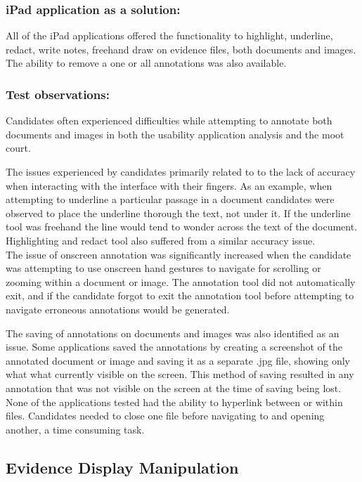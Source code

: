 \subsubsection{iPad application as a solution:}
All of the iPad applications offered the functionality to highlight, underline, redact, write notes, freehand draw on evidence files, both documents and images. The ability to remove a one or all annotations was also available.

\subsubsection{Test observations:}
Candidates often experienced difficulties while attempting to annotate both documents and images in both the usability application analysis and the moot court.

The issues experienced by candidates primarily related to to the lack of accuracy when interacting with the interface with their fingers. As an example, when attempting to underline a particular passage in a document candidates were observed to place the underline thorough the text, not under it. If the underline tool was freehand the line would tend to wonder across the text of the document. Highlighting and redact tool also suffered from a similar accuracy issue.\\
The issue of onscreen annotation was significantly increased when the candidate was attempting to use onscreen hand gestures to navigate for scrolling or zooming within a document or image. The annotation tool did not automatically exit, and if the candidate forgot to exit the annotation tool before attempting to navigate erroneous annotations  would be generated.

The saving of annotations on documents and images was also identified as an issue. Some applications saved the annotations by creating a screenshot of the annotated document or image and saving it as a separate .jpg file, showing only what what currently visible on the screen. This method of saving resulted in any annotation that was not visible on the screen at the time of saving being lost.
None of the applications tested had the ability to hyperlink between or within files. Candidates needed to close one file before navigating to and opening another, a time consuming task.


\subsection{Evidence Display Manipulation}
